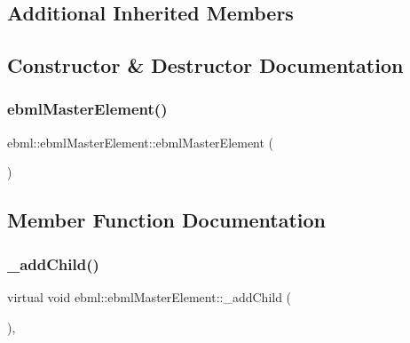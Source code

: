 \subsection*{Additional Inherited Members}


\subsection{Constructor \& Destructor Documentation}
\mbox{\label{classebml_1_1ebmlMasterElement_a874430a761ddf6eeb704d40136e75d33}} 
\subsubsection{\texorpdfstring{ebml\+Master\+Element()}{ebmlMasterElement()}}
{\footnotesize\ttfamily ebml\+::ebml\+Master\+Element\+::ebml\+Master\+Element (\begin{DoxyParamCaption}\item[{const \mbox{\hyperlink{classebml_1_1ebmlMasterElementClass}{ebml\+Master\+Element\+Class}} $\ast$}]{ }\end{DoxyParamCaption})\hspace{0.3cm}{\ttfamily [protected]}}



\subsection{Member Function Documentation}
\mbox{\label{classebml_1_1ebmlMasterElement_a59c5f3b3409fd5fd6f0f22c7a68f1c9b}} 
\subsubsection{\texorpdfstring{\+\_\+add\+Child()}{\_addChild()}\hspace{0.1cm}{\footnotesize\ttfamily [1/2]}}
{\footnotesize\ttfamily virtual void ebml\+::ebml\+Master\+Element\+::\+\_\+add\+Child (\begin{DoxyParamCaption}\item[{const \mbox{\hyperlink{namespaceebml_adad533b7705a16bb360fe56380c5e7be}{ebml\+Element\+\_\+sp}} \&}]{ }\end{DoxyParamCaption})\hspace{0.3cm}{\ttfamily [protected]}, {}}



